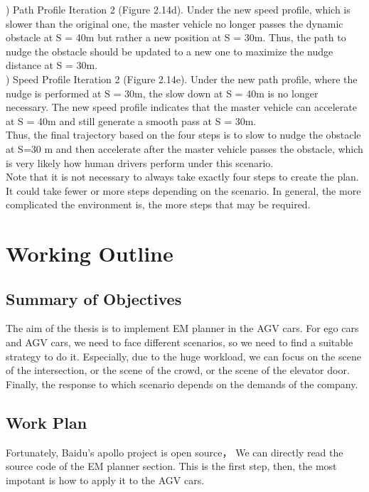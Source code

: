 \documentclass{thesisreport}
\begin{document}
) Path Profile Iteration 2 (Figure 2.14d). Under the new speed profile, which is slower than
the original one, the master vehicle no longer passes the dynamic obstacle at S = 40m but rather a new position at S = 30m. Thus, the path to nudge the obstacle should be updated to a new one to maximize the nudge distance at S = 30m.\\
) Speed Profile Iteration 2 (Figure 2.14e). Under the new path profile, where the nudge is performed at S = 30m, the slow down at S = 40m is no longer necessary. The new
speed profile indicates that the master vehicle can accelerate at S = 40m and still generate a smooth pass at S = 30m.\\
\indent
Thus, the final trajectory based on the four steps is to slow to nudge the obstacle at S=30 m and then accelerate after the master vehicle passes the obstacle, which is very likely how human drivers perform under this scenario.\\
\indent
Note that it is not necessary to always take
exactly four steps to create the plan. It could take
fewer or more steps depending on the scenario. In
general, the more complicated the environment is,
the more steps that may be required.
 \chapter{Working Outline}
 \section{Summary of Objectives}
 The aim of the thesis is to implement EM planner in the  AGV cars. For ego cars and AGV cars, we need to face different scenarios, so we need to find a suitable strategy to do it. Especially, due to the huge workload, we can focus on the scene of the intersection, or the scene of the crowd, or the scene of the elevator door.
 Finally, the response to which scenario depends on the demands of the company.
 \section{Work Plan}
 Fortunately, Baidu's apollo project is open source， We can directly read the source code of the EM planner section. This is the first step, then, the most impotant is how to apply it to the AGV cars.
\end{document}
